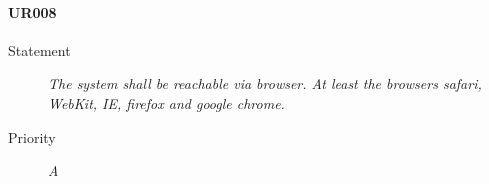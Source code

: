 \paragraph{UR008}
  \begin{description}
  \item [Statement] 
    \textit{ The system shall be reachable via browser.
			 At least the browsers safari, WebKit, IE, firefox and google chrome.}
  \item [Priority] \textit{A}
\end{description}